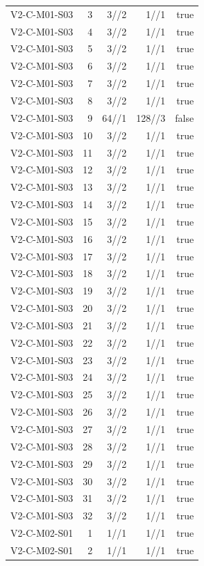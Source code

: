 {\begin{longtable}{lrrrr}
V2-C-M01-S03 & 3 & 3//2 & 1//1 & true \\
V2-C-M01-S03 & 4 & 3//2 & 1//1 & true \\
V2-C-M01-S03 & 5 & 3//2 & 1//1 & true \\
V2-C-M01-S03 & 6 & 3//2 & 1//1 & true \\
V2-C-M01-S03 & 7 & 3//2 & 1//1 & true \\
V2-C-M01-S03 & 8 & 3//2 & 1//1 & true \\
V2-C-M01-S03 & 9 & 64//1 & 128//3 & false \\
V2-C-M01-S03 & 10 & 3//2 & 1//1 & true \\
V2-C-M01-S03 & 11 & 3//2 & 1//1 & true \\
V2-C-M01-S03 & 12 & 3//2 & 1//1 & true \\
V2-C-M01-S03 & 13 & 3//2 & 1//1 & true \\
V2-C-M01-S03 & 14 & 3//2 & 1//1 & true \\
V2-C-M01-S03 & 15 & 3//2 & 1//1 & true \\
V2-C-M01-S03 & 16 & 3//2 & 1//1 & true \\
V2-C-M01-S03 & 17 & 3//2 & 1//1 & true \\
V2-C-M01-S03 & 18 & 3//2 & 1//1 & true \\
V2-C-M01-S03 & 19 & 3//2 & 1//1 & true \\
V2-C-M01-S03 & 20 & 3//2 & 1//1 & true \\
V2-C-M01-S03 & 21 & 3//2 & 1//1 & true \\
V2-C-M01-S03 & 22 & 3//2 & 1//1 & true \\
V2-C-M01-S03 & 23 & 3//2 & 1//1 & true \\
V2-C-M01-S03 & 24 & 3//2 & 1//1 & true \\
V2-C-M01-S03 & 25 & 3//2 & 1//1 & true \\
V2-C-M01-S03 & 26 & 3//2 & 1//1 & true \\
V2-C-M01-S03 & 27 & 3//2 & 1//1 & true \\
V2-C-M01-S03 & 28 & 3//2 & 1//1 & true \\
V2-C-M01-S03 & 29 & 3//2 & 1//1 & true \\
V2-C-M01-S03 & 30 & 3//2 & 1//1 & true \\
V2-C-M01-S03 & 31 & 3//2 & 1//1 & true \\
V2-C-M01-S03 & 32 & 3//2 & 1//1 & true \\
V2-C-M02-S01 & 1 & 1//1 & 1//1 & true \\
V2-C-M02-S01 & 2 & 1//1 & 1//1 & true \\

\end{longtable}}
